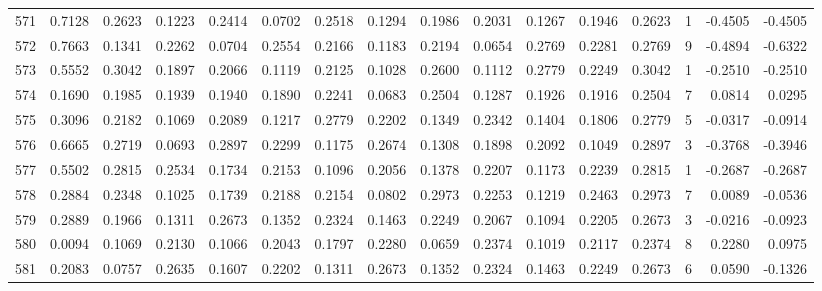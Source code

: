 \begin{tabular}{lrrrrrrrrrrrrrrr}
571 &      0.7128 &  0.2623 &  0.1223 &  0.2414 &  0.0702 &  0.2518 &  0.1294 &  0.1986 &  0.2031 &  0.1267 &   0.1946 &     0.2623 &      1 &                   -0.4505 &                    -0.4505 \\
572 &      0.7663 &  0.1341 &  0.2262 &  0.0704 &  0.2554 &  0.2166 &  0.1183 &  0.2194 &  0.0654 &  0.2769 &   0.2281 &     0.2769 &      9 &                   -0.4894 &                    -0.6322 \\
573 &      0.5552 &  0.3042 &  0.1897 &  0.2066 &  0.1119 &  0.2125 &  0.1028 &  0.2600 &  0.1112 &  0.2779 &   0.2249 &     0.3042 &      1 &                   -0.2510 &                    -0.2510 \\
574 &      0.1690 &  0.1985 &  0.1939 &  0.1940 &  0.1890 &  0.2241 &  0.0683 &  0.2504 &  0.1287 &  0.1926 &   0.1916 &     0.2504 &      7 &                    0.0814 &                     0.0295 \\
575 &      0.3096 &  0.2182 &  0.1069 &  0.2089 &  0.1217 &  0.2779 &  0.2202 &  0.1349 &  0.2342 &  0.1404 &   0.1806 &     0.2779 &      5 &                   -0.0317 &                    -0.0914 \\
576 &      0.6665 &  0.2719 &  0.0693 &  0.2897 &  0.2299 &  0.1175 &  0.2674 &  0.1308 &  0.1898 &  0.2092 &   0.1049 &     0.2897 &      3 &                   -0.3768 &                    -0.3946 \\
577 &      0.5502 &  0.2815 &  0.2534 &  0.1734 &  0.2153 &  0.1096 &  0.2056 &  0.1378 &  0.2207 &  0.1173 &   0.2239 &     0.2815 &      1 &                   -0.2687 &                    -0.2687 \\
578 &      0.2884 &  0.2348 &  0.1025 &  0.1739 &  0.2188 &  0.2154 &  0.0802 &  0.2973 &  0.2253 &  0.1219 &   0.2463 &     0.2973 &      7 &                    0.0089 &                    -0.0536 \\
579 &      0.2889 &  0.1966 &  0.1311 &  0.2673 &  0.1352 &  0.2324 &  0.1463 &  0.2249 &  0.2067 &  0.1094 &   0.2205 &     0.2673 &      3 &                   -0.0216 &                    -0.0923 \\
580 &      0.0094 &  0.1069 &  0.2130 &  0.1066 &  0.2043 &  0.1797 &  0.2280 &  0.0659 &  0.2374 &  0.1019 &   0.2117 &     0.2374 &      8 &                    0.2280 &                     0.0975 \\
581 &      0.2083 &  0.0757 &  0.2635 &  0.1607 &  0.2202 &  0.1311 &  0.2673 &  0.1352 &  0.2324 &  0.1463 &   0.2249 &     0.2673 &      6 &                    0.0590 &                    -0.1326 \\

\end{tabular}
